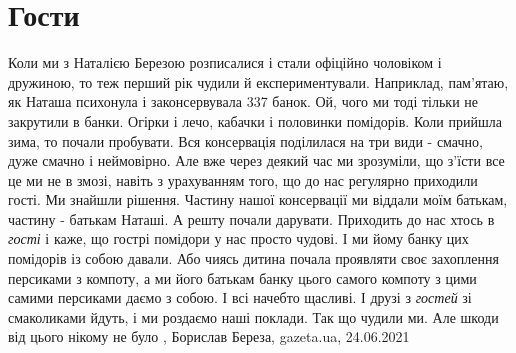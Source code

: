  
 
 
 
 
\chapter{Гости}

Коли ми з Наталією Березою розписалися і стали офіційно чоловіком і дружиною,
то теж перший рік чудили й експериментували. Наприклад, пам'ятаю, як Наташа
психонула і законсервувала 337 банок. Ой, чого ми тоді тільки не закрутили в
банки. Огірки і лечо, кабачки і половинки помідорів. Коли прийшла зима, то
почали пробувати. Вся консервація поділилася на три види - смачно, дуже смачно
і неймовірно. Але вже через деякий час ми зрозуміли, що з'їсти все це ми не в
змозі, навіть з урахуванням того, що до нас регулярно приходили гості. Ми
знайшли рішення. Частину нашої консервації ми віддали моїм батькам, частину -
батькам Наташі. А решту почали дарувати. Приходить до нас хтось в \emph{гості} і каже,
що гострі помідори у нас просто чудові. І ми йому банку цих помідорів із собою
давали. Або чиясь дитина почала проявляти своє захоплення персиками з компоту,
а ми його батькам банку цього самого компоту з цими самими персиками даємо з
собою. І всі начебто щасливі. І друзі з \emph{гостей} зі смаколиками йдуть, і ми
роздаємо наші поклади. Так що чудили ми. Але шкоди від цього нікому не було
, 
Борислав Береза, gazeta.ua, 24.06.2021

